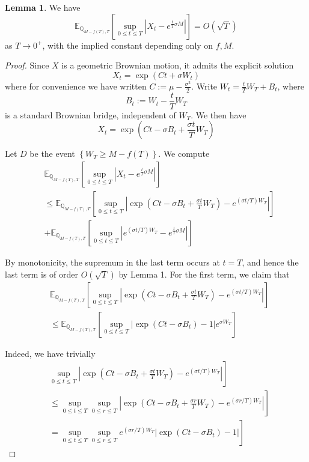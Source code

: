 \documentclass{article}
\theoremstyle{definition}
\newtheorem{lemma}[theorem]{Lemma}
\theoremstyle{definition}
\begin{document}
\begin{lemma}We have
$$
\mathbb{E}_{\mathbb{Q}_{M-f(T), T}}\left[\sup _{0 \leq t \leq T}\left|X_{t}-e^{\frac{t}{T} \sigma M}\right|\right]=O(\sqrt{T})
$$
as $T \rightarrow 0^{+}$, with the implied constant depending only on $f, M$.
\end{lemma}
\begin{proof}Since $X$ is a geometric Brownian motion, it admits the explicit solution
$$
X_{t}=\exp \left(C t+\sigma W_{t}\right)
$$
where for convenience we have written $C:=\mu-\frac{\sigma^{2}}{2}$. Write $W_{t}=\frac{t}{T} W_{T}+B_{t}$, where
$$
B_{t}:=W_{t}-\frac{t}{T} W_{T}
$$
is a standard Brownian bridge, independent of $W_{T}$. We then have
$$
X_{t}=\exp \left(C t-\sigma B_{t}+\frac{\sigma t}{T} W_{T}\right)
$$

Let $D$ be the event $\left\{W_{T} \geq M-f(T)\right\}$. We compute
$$
\begin{aligned}
& \mathbb{E}_{\mathbb{Q}_{M-f(T), T}}\left[\sup _{0 \leq t \leq T}\left|X_{t}-e^{\frac{t}{T} \sigma M}\right|\right] \\
& \leq \mathbb{E}_{\mathbb{Q}_{M-f(T), T}}\left[\sup _{0 \leq t \leq T}\left|\exp \left(C t-\sigma B_{t}+\frac{\sigma t}{T} W_{T}\right)-e^{(\sigma t / T) W_{T}}\right|\right] \\
& +\mathbb{E}_{\mathbb{Q}_{M-f(T), T}}\left[\sup _{0 \leq t \leq T}\left|e^{(\sigma t / T) W_{T}}-e^{\frac{t}{T} \sigma M}\right|\right]
\end{aligned}
$$

By monotonicity, the supremum in the last term occurs at $t=T$, and hence the last term is of order $O(\sqrt{T})$ by Lemma 1. For the first term, we claim that
$$
\begin{aligned}
& \mathbb{E}_{\mathbb{Q}_{M-f(T), T}} {\left[\sup _{0 \leq t \leq T}\left|\exp \left(C t-\sigma B_{t}+\frac{\sigma t}{T} W_{T}\right)-e^{(\sigma t / T) W_{T}}\right|\right] } \\
& \leq \mathbb{E}_{\mathbb{Q}_{M-f(T), T}}\left[\sup _{0 \leq t \leq T}\left|\exp \left(C t-\sigma B_{t}\right)-1\right| e^{\sigma W_{T}}\right] 
\end{aligned}
$$

Indeed, we have trivially
$$
\begin{aligned}
& \left.\sup _{0 \leq t \leq T}\left|\exp \left(C t-\sigma B_{t}+\frac{\sigma t}{T} W_{T}\right)-e^{(\sigma t / T) W_{T}}\right|\right] \\
& \left.\leq \sup _{0 \leq t \leq T} \sup _{0 \leq r \leq T}\left|\exp \left(C t-\sigma B_{t}+\frac{\sigma r}{T} W_{T}\right)-e^{(\sigma r / T) W_{T}}\right|\right] \\
& \left.=\sup _{0 \leq t \leq T} \sup _{0 \leq r \leq T} e^{(\sigma r / T) W_{T}}\left|\exp \left(C t-\sigma B_{t}\right)-1\right|\right]
\end{aligned}
$$


\end{proof}
\end{document}
